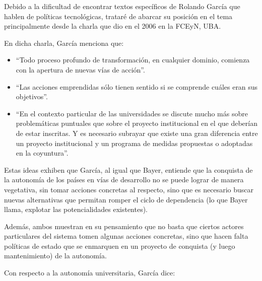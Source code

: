 Debido a la dificultad de encontrar textos específicos de Rolando García que hablen de políticas tecnológicas, trataré de abarcar su posición en el tema principalmente desde la charla que dio en el 2006 en la FCEyN, UBA.

En dicha charla, García menciona que:

\begin{itemize}
    \item ``Todo proceso profundo de transformación, en cualquier dominio, comienza con la apertura de nuevas vías de acción''.
    \item ``Las acciones emprendidas sólo tienen sentido si se comprende cuáles eran sus objetivos''.
    \item ``En el contexto particular de las universidades se discute mucho más sobre problemáticas puntuales que sobre el proyecto institucional en el que deberían de estar inscritas. Y es necesario subrayar que existe una gran diferencia entre un proyecto institucional y un programa de medidas propuestas o adoptadas en la coyuntura''.
\end{itemize}

Estas ideas exhiben que García, al igual que Bayer, entiende que la conquista de la autonomía de los países en vías de desarrollo no se puede lograr de manera vegetativa, sin tomar acciones concretas al respecto, sino que es necesario buscar nuevas alternativas que permitan romper el ciclo de dependencia (lo que Bayer llama, explotar las potencialidades existentes).

Además, ambos muestran en su pensamiento que no basta que ciertos actores particulares del sistema tomen algunas acciones concretas, sino que hacen falta políticas de estado que se enmarquen en un proyecto de conquista (y luego mantenimiento) de la autonomía.

Con respecto a la autonomía universitaria, García dice:

